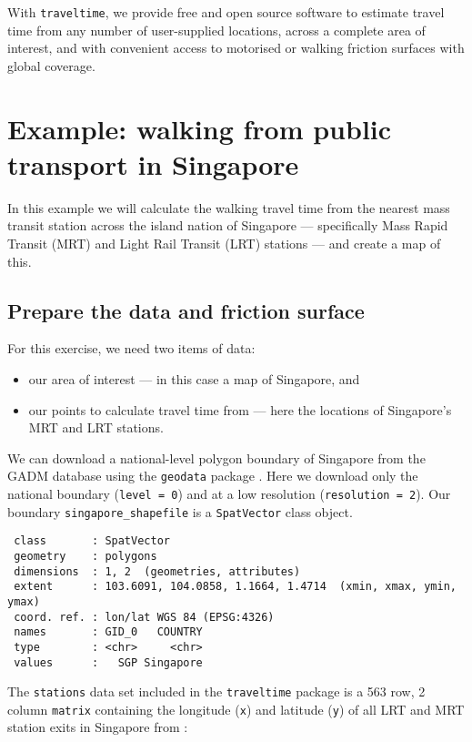 \documentclass[
  10pt,
  letterpaper,
]{article}
\providecommand{\tightlist}{%
  \setlength{\itemsep}{0pt}\setlength{\parskip}{0pt}}\usepackage{longtable,booktabs,array}
\begin{document}
With \texttt{traveltime}, we provide free and open source software to
estimate travel time from any number of user-supplied locations, across
a complete area of interest, and with convenient access to motorised or
walking friction surfaces with global coverage.

\section{Example: walking from public transport in
Singapore}\label{example-walking-from-public-transport-in-singapore}

In this example we will calculate the walking travel time from the
nearest mass transit station across the island nation of Singapore ---
specifically Mass Rapid Transit (MRT) and Light Rail Transit (LRT)
stations --- and create a map of this.

\subsection{Prepare the data and friction
surface}\label{prepare-the-data-and-friction-surface}

For this exercise, we need two items of data:

\begin{itemize}
\tightlist
\item
  our area of interest --- in this case a map of Singapore, and
\item
  our points to calculate travel time from --- here the locations of
  Singapore's MRT and LRT stations.
\end{itemize}

We can download a national-level polygon boundary of Singapore from the
GADM \citep{gadm} database using the \texttt{geodata} package
\citep{geodata}. Here we download only the national boundary
(\texttt{level\ =\ 0}) and at a low resolution
(\texttt{resolution\ =\ 2}). Our boundary \texttt{singapore\_shapefile}
is a \texttt{SpatVector} class object.

\begin{verbatim}
 class       : SpatVector 
 geometry    : polygons 
 dimensions  : 1, 2  (geometries, attributes)
 extent      : 103.6091, 104.0858, 1.1664, 1.4714  (xmin, xmax, ymin, ymax)
 coord. ref. : lon/lat WGS 84 (EPSG:4326) 
 names       : GID_0   COUNTRY
 type        : <chr>     <chr>
 values      :   SGP Singapore
\end{verbatim}

The \texttt{stations} data set included in the \texttt{traveltime}
package is a 563 row, 2 column \texttt{matrix} containing the longitude
(\texttt{x}) and latitude (\texttt{y}) of all LRT and MRT station exits
in Singapore from \citet{singdata}:
\end{document}
